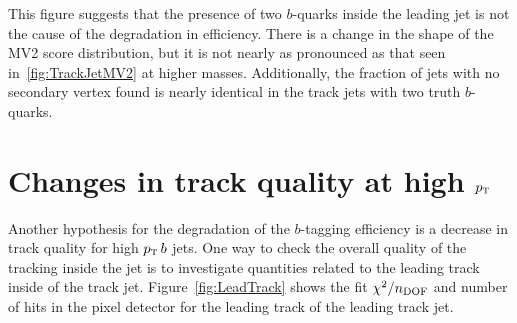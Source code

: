 %
This figure suggests that the presence of two $b$-quarks inside the leading jet is not the cause of the degradation in efficiency. There is a change in the shape of the MV2 score distribution, but it is not nearly as pronounced as that seen in~\ref{fig:TrackJetMV2} at higher masses. Additionally, the fraction of jets with no secondary vertex found is nearly identical in the track jets with two truth $b$-quarks. 

\section{Changes in track quality at high $p_{\textrm{\footnotesize\sc t}}$}

Another hypothesis for the degradation of the $b$-tagging efficiency is a decrease in track quality for high $p_{\textrm{\footnotesize\sc t}}\,b$ jets. One way to check the overall quality of the tracking inside the jet is to investigate quantities related to the leading track inside of the track jet. Figure~\ref{fig:LeadTrack} shows the fit $\chi^2/n_{\rm DOF}$ and number of hits in the pixel detector for the leading track of the leading track jet. 
%
